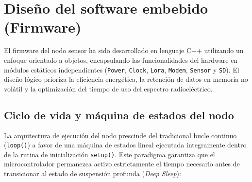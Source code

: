 
\section{Diseño del software embebido (Firmware)}

El firmware del nodo sensor ha sido desarrollado en lenguaje C++ utilizando un enfoque orientado a objetos, encapsulando las funcionalidades del hardware en módulos estáticos independientes (\texttt{Power}, \texttt{Clock}, \texttt{Lora}, \texttt{Modem}, \texttt{Sensor} y \texttt{SD}). El diseño lógico prioriza la eficiencia energética, la retención de datos en memoria no volátil y la optimización del tiempo de uso del espectro radioeléctrico.

\subsection{Ciclo de vida y máquina de estados del nodo}
La arquitectura de ejecución del nodo prescinde del tradicional bucle continuo (\texttt{loop()}) a favor de una máquina de estados lineal ejecutada íntegramente dentro de la rutina de inicialización \texttt{setup()}. Este paradigma garantiza que el microcontrolador permanezca activo estrictamente el tiempo necesario antes de transicionar al estado de suspensión profunda (\textit{Deep Sleep}):

